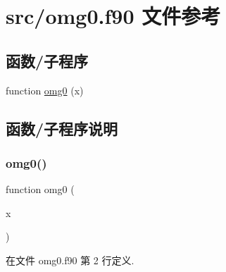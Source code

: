 \hypertarget{omg0_8f90}{}\section{src/omg0.f90 文件参考}
\label{omg0_8f90}
\subsection*{函数/子程序}
\begin{DoxyCompactItemize}
\item 
function \mbox{\hyperlink{omg0_8f90_a73a708f3a1db477b8602c2d290d25080}{omg0}} (x)
\end{DoxyCompactItemize}


\subsection{函数/子程序说明}
\mbox{\label{omg0_8f90_a73a708f3a1db477b8602c2d290d25080}} 
\subsubsection{\texorpdfstring{omg0()}{omg0()}}
{\footnotesize\ttfamily function omg0 (\begin{DoxyParamCaption}\item[{}]{x }\end{DoxyParamCaption})}



在文件 omg0.\+f90 第 2 行定义.

